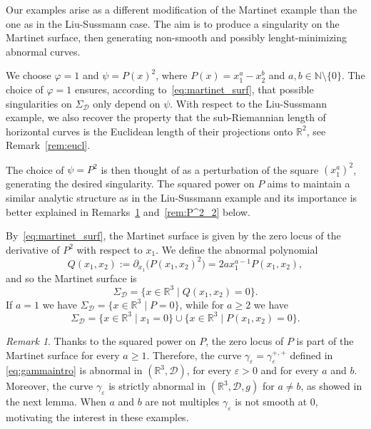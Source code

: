 \documentclass[12pt]{amsart}
\theoremstyle{plain}
\theoremstyle{definition}
\theoremstyle{remark}
\newtheorem{remark}[theorem]{Remark}
\numberwithin{equation}{section}
\newcommand{\R}{\mathbb{R}}
\newcommand{\N}{\mathbb{N}}
\newcommand{\D}{\mathcal{D}}
\newcommand{\<}{\langle}
\renewcommand{\>}{\rangle}
\newcommand{\e}{\varepsilon}
\newcommand{\0}{\theta}
\renewcommand{\d}{\partial}
\newcommand{\g}{\gamma}
\newcommand{\1}{{-1}}
\renewcommand{\=}{\coloneqq}
\renewcommand{\.}{\dots}
\renewcommand{\-}{\cdot}
\renewcommand{\:}{\,:\,}
\theoremstyle{definition}
\begin{document}
\medskip

Our examples arise as a different modification of the Martinet example than the one as in the Liu-Sussmann case. The aim is to produce a singularity on the Martinet surface, then generating non-smooth and possibly lenght-minimizing abnormal curves. 


We choose $\varphi=1$ and $\psi=P(x)^2$, where $P(x)=x_1^a-x_2^b$ and $a,b\in\N\setminus\{0\}$. The choice of $\varphi=1$ ensures, according to~\eqref{eq:martinet_surf}, that possible singularities on $\Sigma_\D$ only depend on $\psi$. With respect to the Liu-Sussmann example, we also recover the property that the sub-Riemannian length of horizontal curves is the Euclidean length of their projections onto $\R^2$, see Remark~\ref{rem:eucl}. 



The choice of $\psi=P^2$ is then thought of as a perturbation of the square $(x_1^a)^2$, generating the desired singularity. The squared power on $P$ aims to maintain a similar analytic structure as in the Liu-Sussmann example and its importance is better explained in Remarks~\ref{rem:P^2_1} and~\ref{rem:P^2_2} below. 


By~\eqref{eq:martinet_surf}, the Martinet surface is given by the zero locus of the derivative of $P^2$ with respect to $x_1$. We define the abnormal polynomial
\begin{equation}
	\label{eq:A}
	Q(x_1,x_2):=\d_{x_1}\big(P(x_1,x_2)^2\big)=2ax_1^{a-1}P(x_1,x_2),
\end{equation}
and so the Martinet surface is
\begin{equation}
	\label{eq:mart_ex}
	\Sigma_\D=\{x\in\R^3\mid Q(x_1,x_2)=0\}.
\end{equation}
If $a=1$ we have $\Sigma_\D=\{x\in\R^3\mid P=0\}$, while for $a\geq2$ we have
\begin{equation}
	\label{eq:mart_ex2}
	\Sigma_\D=\{x\in\R^3\mid x_1=0\}\cup\{x\in\R^3\mid P(x_1,x_2)=0\}.
\end{equation}

\begin{remark}
	\label{rem:P^2_1}
	Thanks to the squared power on $P$, the zero locus of $P$ is part of the Martinet surface for every $a\geq1$. Therefore, the curve $\g_\e=\g_\e^{+,+}$ defined in \eqref{eq:gammaintro} is abnormal in $(\R^3,\D)$, for every $\e>0$ and for every $a$ and $b$. Moreover, the curve $\g_\e$ is strictly abnormal in $(\R^3,\D,g)$ for $a\neq b$, as showed in the next lemma. When $a$ and $b$ are not multiples $\g_\e$ is not smooth at 0, motivating the interest in these examples.
\end{remark}
\end{document}
